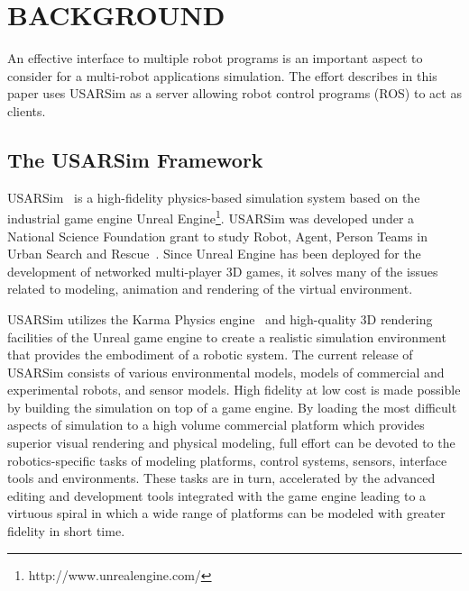 \section*{BACKGROUND}
An effective interface to multiple robot programs is an important aspect to consider for a multi-robot applications simulation. The effort describes in this paper uses USARSim as a server allowing robot control programs (ROS)
to act as clients.

\subsection*{The USARSim Framework}


USARSim~\cite{CARPIN.LNAI.2006,WANG.WSC.2003} is a high-fidelity physics-based simulation system based on the industrial game engine Unreal Engine\footnote{http://www.unrealengine.com/}. USARSim was developed under a National Science Foundation grant to study Robot, Agent, Person Teams in Urban Search and Rescue~\cite{LEWIS.ICHC.2003}. Since Unreal Engine has been deployed for the development of networked multi-player 3D games, it solves many of the issues related to modeling, animation and rendering
of the virtual environment.


USARSim utilizes the Karma Physics engine~\cite{KarmEngine} and high-quality 3D rendering facilities of the Unreal game engine to create a realistic simulation environment that provides the embodiment of a robotic
system. The current release of USARSim consists of various environmental models, models of commercial and experimental robots, and sensor models. High fidelity at low cost is made possible by building the simulation on top of a game engine. By loading the most
difficult aspects of simulation to a high volume commercial platform which provides superior visual rendering and physical modeling, full effort can be devoted to the robotics-specific tasks of modeling platforms, control systems, sensors, interface tools and environments. These tasks are in turn, accelerated by the advanced editing and development tools integrated with the game engine leading to a virtuous spiral in which a wide range of platforms can be modeled with greater fidelity in short time.

